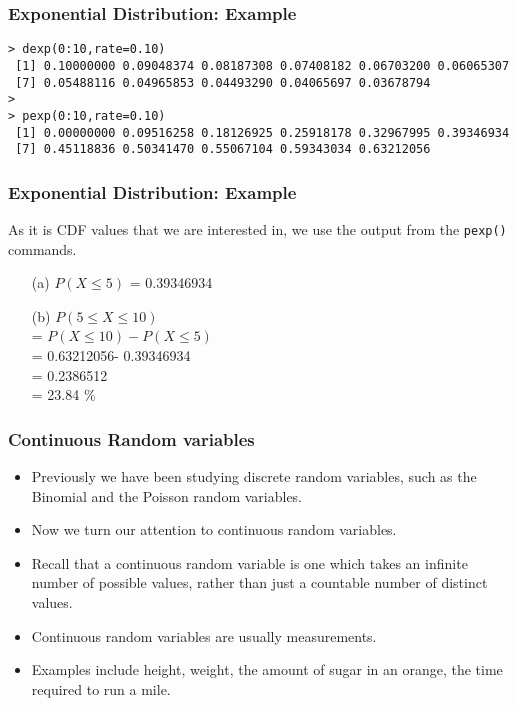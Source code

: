 \documentclass[a4]{beamer}
\begin{document}
\begin{frame}[fragile]
\frametitle{Exponential Distribution: Example}
\begin{verbatim}
> dexp(0:10,rate=0.10)
 [1] 0.10000000 0.09048374 0.08187308 0.07408182 0.06703200 0.06065307
 [7] 0.05488116 0.04965853 0.04493290 0.04065697 0.03678794
>
> pexp(0:10,rate=0.10)
 [1] 0.00000000 0.09516258 0.18126925 0.25918178 0.32967995 0.39346934
 [7] 0.45118836 0.50341470 0.55067104 0.59343034 0.63212056
\end{verbatim}
\end{frame}

\begin{frame}[fragile]
\frametitle{Exponential Distribution: Example}

As it is CDF values that we are interested in, we use the output from the \texttt{pexp()} commands.

\begin{itemize}
\item[(a)] $P(X \leq 5)$ = 0.39346934 
\item[(b)] $P(5 \leq X \leq 10)$ \\ = $P( X \leq 10) - P( X \leq 5)$ \\ = 0.63212056- 0.39346934 \\ = 0.2386512 \\= 23.84 $\%$
\end{itemize}

\end{frame}




\begin{frame}
\frametitle{Continuous Random variables}
\begin{itemize}
\item Previously we have been studying discrete random variables, such as the Binomial and the Poisson random variables.
\item Now we turn our attention to continuous random variables.
\item Recall that a continuous random variable is one which takes an infinite number of possible values, rather than just a countable number of distinct values.
\item Continuous random variables are usually measurements.
\item Examples include height, weight, the amount of sugar in an orange, the time required to run a mile.
\end{itemize}

\end{frame}
\end{document}
